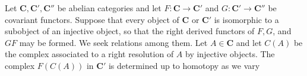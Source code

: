 Let $\mathbf{C},\mathbf{C}',\mathbf{C}''$ be abelian categories and let
$F:\mathbf{C}\to \mathbf{C}'$ and $G:\mathbf{C}'\to \mathbf{C}''$ be covariant functors.
Suppose that every object of $\mathbf{C}$ or $\mathbf{C}'$ is isomorphic to a subobject of an
injective object, so that the right derived functors of $F,G$, and $GF$ may be
formed. We seek relations among them. Let $A\in \mathbf{C}$ and let $C(A)$ be the
complex associated to a right resolution of $A$ by injective objects. The
complex $F(C(A))$ in $\mathbf{C}'$ is determined up to homotopy as we vary

